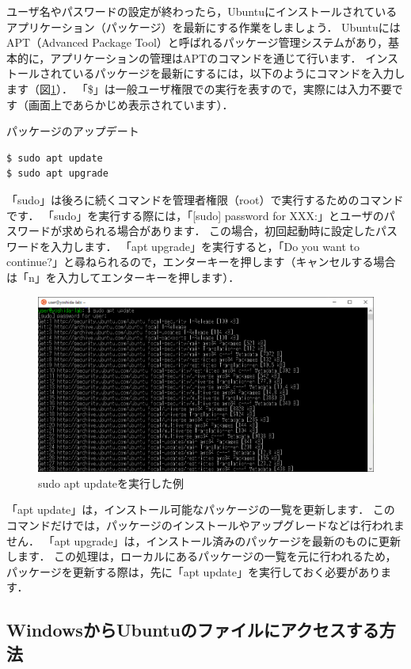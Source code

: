 \documentclass[dvipdfmx]{jarticle}
\begin{document}
ユーザ名やパスワードの設定が終わったら，Ubuntuにインストールされているアプリケーション（パッケージ）を最新にする作業をしましょう．
UbuntuにはAPT（Advanced Package Tool）と呼ばれるパッケージ管理システムがあり，基本的に，アプリケーションの管理はAPTのコマンドを通じて行います．
インストールされているパッケージを最新にするには，以下のようにコマンドを入力します（図\ref{fig:AptUpdate}）．
「\$」は一般ユーザ権限での実行を表すので，実際には入力不要です（画面上であらかじめ表示されています）．
\begin{itembox}[l]{パッケージのアップデート}
\begin{verbatim}
$ sudo apt update
$ sudo apt upgrade
\end{verbatim}
\end{itembox}
「sudo」は後ろに続くコマンドを管理者権限（root）で実行するためのコマンドです．
「sudo」を実行する際には，「[sudo] password for XXX:」とユーザのパスワードが求められる場合があります．
この場合，初回起動時に設定したパスワードを入力します．
「apt upgrade」を実行すると，「Do you want to continue?」と尋ねられるので，エンターキーを押します（キャンセルする場合は「n」を入力してエンターキーを押します）．

\begin{figure}[h]
  \centering
  \includegraphics[width=0.95\linewidth]{figures/UbuntuAptUpdate.png}
  \caption{sudo apt updateを実行した例}
  \label{fig:AptUpdate}
\end{figure}

「apt update」は，インストール可能なパッケージの一覧を更新します．
このコマンドだけでは，パッケージのインストールやアップグレードなどは行われません．
「apt upgrade」は，インストール済みのパッケージを最新のものに更新します．
この処理は，ローカルにあるパッケージの一覧を元に行われるため，パッケージを更新する際は，先に「apt update」を実行しておく必要があります．

\subsection{WindowsからUbuntuのファイルにアクセスする方法}\label{sec:file}
\end{document}
